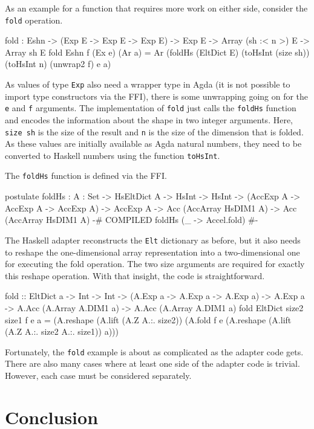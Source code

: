 \documentclass{llncs}
\begin{document}
As an example for a function that requires more work on either side,
consider the \texttt{fold} operation. 
\begin{code}
fold : {E}{sh}{n}
     -> (Exp E -> Exp E -> Exp E)
     -> Exp E
     -> Array (sh :< n >) E
     -> Array sh E
fold {E}{sh}{n} f (Ex e) (Ar a) =
  Ar (foldHs (EltDict E) (toHsInt (size sh)) (toHsInt n)
             (unwrap2 f) e a)
\end{code}
As values of type \texttt{Exp} also need a wrapper type in Agda (it is
not possible to import type constructors via the FFI), there is some
unwrapping going on for the \texttt{e} and \texttt{f}
arguments. The implementation of \texttt{fold} just calls the
\texttt{foldHs} function and encodes the information about the shape
in two integer arguments. Here, \texttt{size sh} is the size of the
result and \texttt{n} is the size of the dimension that is folded. As
these values are initially available as Agda natural numbers, they need to
be converted to Haskell numbers using the function \texttt{toHsInt}.

The \texttt{foldHs} function is defined via the FFI.
\begin{code}
postulate
  foldHs : {A : Set}
          -> HsEltDict A
          -> HsInt
          -> HsInt
          -> (AccExp A -> AccExp A -> AccExp A)
          -> AccExp A
          -> Acc (AccArray HsDIM1 A)
          -> Acc (AccArray HsDIM1 A)
  {-# COMPILED foldHs      (\_ -> Accel.fold) #-}
\end{code}
The Haskell adapter reconstructs the \texttt{Elt} dictionary
as before, but it also needs to reshape the one-dimensional array
representation into a two-dimensional one for executing the fold
operation. The two size arguments are required for exactly this
reshape operation. With that insight, the code is straightforward.
\begin{hcode}
fold :: EltDict a
     -> Int -> Int
     -> (A.Exp a -> A.Exp a -> A.Exp a)
     -> A.Exp a
     -> A.Acc (A.Array A.DIM1 a)
     -> A.Acc (A.Array A.DIM1 a)
fold EltDict size2 size1 f e a =
     (A.reshape (A.lift (A.Z A.:. size2))
      (A.fold f e
       (A.reshape (A.lift (A.Z A.:. size2 A.:. size1)) a)))
\end{hcode}

Fortunately, the \texttt{fold} example is about as complicated as the
adapter code gets. There are also many cases where at least one side
of the adapter code is trivial. However, each case must be considered
separately. 

\section{Conclusion}
\label{sec:conclusion}
\end{document}
